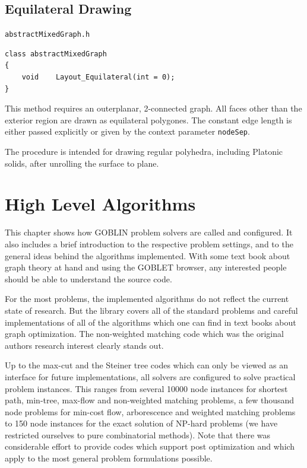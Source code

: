 \documentclass[a4paper,11pt,twoside]{book}
\begin{document}
\begin{multicols}{2}
\section{Equilateral Drawing}
\label{slb_equilateral}
\myinclude\verb/abstractMixedGraph.h/
\begin{mymethods}
\begin{verbatim}
class abstractMixedGraph
{
    void    Layout_Equilateral(int = 0);
}
\end{verbatim}
\end{mymethods}
This method requires an outerplanar, 2-connected graph. All faces other than
the exterior region are drawn as equilateral polygones. The constant edge length
is either passed explicitly or given by the context parameter \verb/nodeSep/.

The procedure is intended for drawing regular polyhedra, including Platonic
solids, after unrolling the surface to plane.



\cleardoublepage
{}
\chapter{High Level Algorithms}
\thispagestyle{fancy}
\label{clb6}
This chapter shows how GOBLIN problem solvers are called and configured.
It also includes a brief introduction to the respective problem settings,
and to the general ideas behind the algorithms implemented.
With some text book about graph theory at hand and using the GOBLET browser,
any interested people should be able to understand the source code.

For the most problems, the implemented algorithms do not reflect the current
state of research. But the library covers all of the standard problems and
careful implementations of all of the algorithms which one can find in text
books about graph optimization. The non-weighted matching code which was
the original authors research interest clearly stands out.

Up to the max-cut and the Steiner tree codes which can only be viewed as an
interface for future implementations, all solvers are configured to solve
practical problem instances. This ranges from several 10000 node instances for
shortest path, min-tree, max-flow and non-weighted matching problems, a few
thousand node problems for min-cost flow, arborescence and weighted matching
problems to 150 node instances for the exact solution of NP-hard problems
(we have restricted ourselves to pure combinatorial methods).
Note that there was considerable effort to provide codes which support post
optimization and which apply to the most general problem formulations possible.




\end{multicols}
\end{document}
